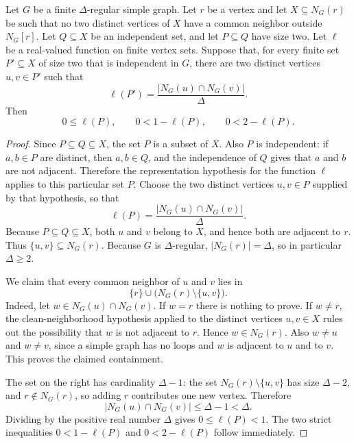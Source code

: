 \begin{helper}
Let $G$ be a finite $\Delta$-regular simple graph.  Let $r$ be a vertex and
let $X\subseteq N_G(r)$ be such that no two distinct vertices of $X$ have a
common neighbor outside $N_G[r]$.  Let $Q\subseteq X$ be an independent set,
and let $P\subseteq Q$ have size two.  Let $\ell$ be a real-valued function
on finite vertex sets.  Suppose that, for every finite set $P'\subseteq X$
of size two that is independent in $G$, there are two distinct vertices
$u,v\in P'$ such that
\[
\ell(P')=\frac{|N_G(u)\cap N_G(v)|}{\Delta}.
\]
Then
\[
0\le \ell(P),\qquad 0<1-\ell(P),\qquad 0<2-\ell(P).
\]
\end{helper}
\begin{proof}
Since $P\subseteq Q\subseteq X$, the set $P$ is a subset of $X$.  Also $P$
is independent: if $a,b\in P$ are distinct, then $a,b\in Q$, and the
independence of $Q$ gives that $a$ and $b$ are not adjacent.  Therefore the
representation hypothesis for the function $\ell$ applies to this particular
set $P$.  Choose the two distinct vertices $u,v\in P$ supplied by that
hypothesis, so that
\[
\ell(P)=\frac{|N_G(u)\cap N_G(v)|}{\Delta}.
\]
Because $P\subseteq Q\subseteq X$, both $u$ and $v$ belong to $X$, and hence
both are adjacent to $r$.  Thus $\{u,v\}\subseteq N_G(r)$.  Because $G$ is
$\Delta$-regular, $|N_G(r)|=\Delta$, so in particular $\Delta\ge 2$.

We claim that every common neighbor of $u$ and $v$ lies in
\[
\{r\}\cup\bigl(N_G(r)\setminus\{u,v\}\bigr).
\]
Indeed, let $w\in N_G(u)\cap N_G(v)$.  If $w=r$ there is nothing to prove.
If $w\ne r$, the clean-neighborhood hypothesis applied to the distinct
vertices $u,v\in X$ rules out the possibility that $w$ is not adjacent to
$r$.  Hence $w\in N_G(r)$.  Also $w\ne u$ and $w\ne v$, since a simple graph
has no loops and $w$ is adjacent to $u$ and to $v$.  This proves the claimed
containment.

The set on the right has cardinality $\Delta-1$: the set
$N_G(r)\setminus\{u,v\}$ has size $\Delta-2$, and $r\notin N_G(r)$, so adding
$r$ contributes one new vertex.  Therefore
\[
|N_G(u)\cap N_G(v)|\le \Delta-1<\Delta .
\]
Dividing by the positive real number $\Delta$ gives
$0\le \ell(P)<1$.  The two strict inequalities
$0<1-\ell(P)$ and $0<2-\ell(P)$ follow immediately.
\end{proof}
